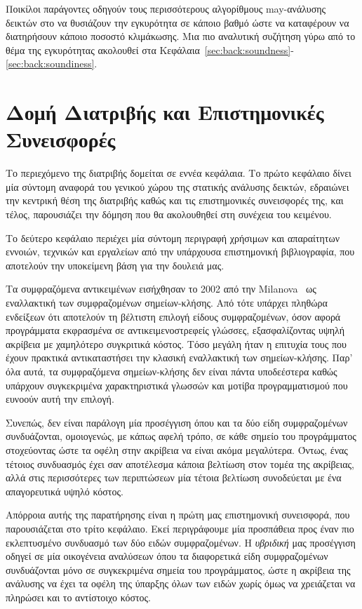 Ποικίλοι παράγοντες οδηγούν τους περισσότερους αλγορίθμους {\en may}-ανάλυσης δεικτών στο να θυσιάζουν την εγκυρότητα σε κάποιο βαθμό ώστε να καταφέρουν να διατηρήσουν κάποιο ποσοστό κλιμάκωσης. Μια πιο αναλυτική συζήτηση γύρω από το θέμα της εγκυρότητας ακολουθεί στα Κεφάλαια~\ref{sec:back:soundness}-\ref{sec:back:soundiness}.



\section*{Δομή Διατριβής και Επιστημονικές Συνεισφορές}

Το περιεχόμενο της διατριβής δομείται σε εννέα κεφάλαια. Το πρώτο κεφάλαιο δίνει μία σύντομη αναφορά του γενικού χώρου της στατικής ανάλυσης δεικτών, εδραιώνει την κεντρική θέση της διατριβής καθώς και τις επιστημονικές συνεισφορές της, και τέλος, παρουσιάζει την δόμηση που θα ακολουθηθεί στη συνέχεια του κειμένου.

Το δεύτερο κεφάλαιο περιέχει μία σύντομη περιγραφή χρήσιμων και απαραίτητων εννοιών, τεχνικών και εργαλείων από την υπάρχουσα επιστημονική βιβλιογραφία, που αποτελούν την υποκείμενη βάση για την δουλειά μας.


Τα συμφραζόμενα αντικειμένων εισήχθησαν το 2002 από την {\en Milanova}~\cite{issta:2002:Milanova} ως εναλλακτική των συμφραζομένων σημείων-κλήσης. Από τότε υπάρχει πληθώρα ενδείξεων ότι αποτελούν τη βέλτιστη επιλογή είδους συμφραζομένων, όσον αφορά προγράμματα εκφρασμένα σε αντικειμενοστρεφείς γλώσσες, εξασφαλίζοντας υψηλή ακρίβεια με χαμηλότερο συγκριτικά κόστος. Τόσο μεγάλη ήταν η επιτυχία τους που έχουν πρακτικά αντικαταστήσει την κλασική εναλλακτική των σημείων-κλήσης. Παρ' όλα αυτά, τα συμφραζόμενα σημείων-κλήσης δεν είναι πάντα υποδεέστερα καθώς υπάρχουν συγκεκριμένα χαρακτηριστικά γλωσσών και μοτίβα προγραμματισμού που ευνοούν αυτή την επιλογή.

Συνεπώς, δεν είναι παράλογη μία προσέγγιση όπου και τα δύο είδη συμφραζομένων συνδυάζονται, ομοιογενώς, με κάπως αφελή τρόπο, σε κάθε σημείο του προγράμματος στοχεύοντας ώστε τα οφέλη στην ακρίβεια να είναι ακόμα μεγαλύτερα. Όντως, ένας τέτοιος συνδυασμός έχει σαν αποτέλεσμα κάποια βελτίωση στον τομέα της ακρίβειας, αλλά στις περισσότερες των περιπτώσεων μία τέτοια βελτίωση συνοδεύεται με ένα απαγορευτικά υψηλό κόστος.

Απόρροια αυτής της παρατήρησης είναι η πρώτη μας επιστημονική συνεισφορά, που παρουσιάζεται στο τρίτο κεφάλαιο. Εκεί περιγράφουμε μία προσπάθεια προς έναν πιο εκλεπτυσμένο συνδυασμό των δύο ειδών συμφραζομένων. Η \emph{υβριδική} μας προσέγγιση οδηγεί σε μία οικογένεια αναλύσεων όπου τα διαφορετικά είδη συμφραζομένων συνδυάζονται μόνο σε συγκεκριμένα σημεία του προγράμματος, ώστε η ακρίβεια της ανάλυσης να έχει τα οφέλη της ύπαρξης όλων των ειδών χωρίς όμως να χρειάζεται να πληρώσει και το αντίστοιχο κόστος.

